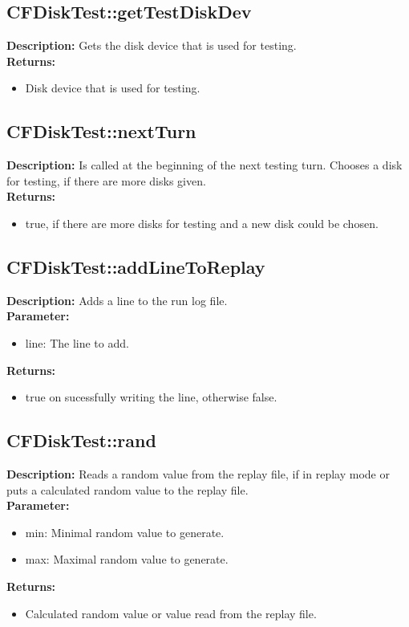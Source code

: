 \subsection{CFDiskTest::getTestDiskDev}
\textbf{Description:} Gets the disk device that is used for testing.\\
\textbf{Returns:}
\begin{itemize}
\item Disk device that is used for testing.
\end{itemize}

\subsection{CFDiskTest::nextTurn}
\textbf{Description:} Is called at the beginning of the next testing turn. Chooses a disk for testing, if there are more disks given.\\
\textbf{Returns:}
\begin{itemize}
\item true, if there are more disks for testing and a new disk could be chosen.
\end{itemize}

\subsection{CFDiskTest::addLineToReplay}
\textbf{Description:} Adds a line to the run log file.\\
\textbf{Parameter:}
\begin{itemize}
\item line: The line to add.
\end{itemize}
\textbf{Returns:}
\begin{itemize}
\item true on sucessfully writing the line, otherwise false.
\end{itemize}

\subsection{CFDiskTest::rand}
\textbf{Description:} Reads a random value from the replay file, if in replay mode or puts a calculated random value to the replay file.\\
\textbf{Parameter:}
\begin{itemize}
\item min: Minimal random value to generate.
\item max: Maximal random value to generate.
\end{itemize}
\textbf{Returns:}
\begin{itemize}
\item Calculated random value or value read from the replay file.
\end{itemize}

